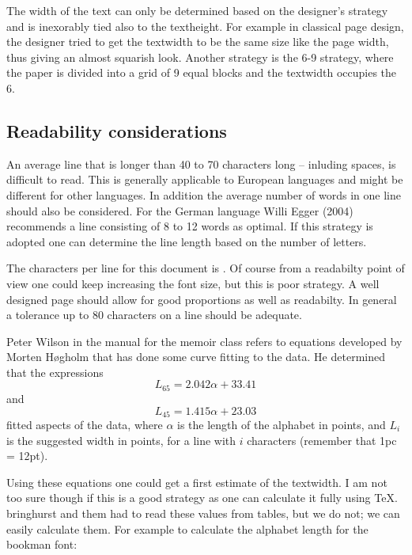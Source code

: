 The width of the text can only be determined based on the designer's strategy and is inexorably tied also to
the textheight. For example in classical page design, the designer tried to get the textwidth to be the same size like the page width, thus giving an almost squarish look. Another strategy is the 6-9 strategy, where the paper is divided into a grid of 9 equal blocks and the textwidth occupies the 6. 

\subsection{Readability considerations}

An average line that is longer than 40 to 70 characters long -- inluding spaces, is difficult to read. This is generally applicable to European languages and might be different for other languages. In addition the average number of words in one line should also be considered. For the German language Willi Egger (2004) recommends a line consisting of 8 to 12 words as optimal. If this strategy is adopted one can determine the line length based on the number of letters.

The characters per line for this document is \charactersperline. Of course from a readabilty point of view one could keep increasing the font size, but this is poor strategy. A well designed page should allow for good proportions as well as readabilty. In general a tolerance up  to 80 characters on a line should be adequate.

Peter Wilson in the manual for the memoir class refers to equations developed by Morten H{\o}gholm that has done some curve fitting
to the data. He determined that the expressions
\begin{equation}
L_{65} = 2.042\alpha + 33.41 \label{eq:L65}
\end{equation}
and
\begin{equation}
L_{45} = 1.415\alpha + 23.03 \label{eq:L45}
\end{equation}
fitted aspects of the data, where $\alpha$ is the length of the alphabet
in points, and $L_{i}$ is the suggested width in points, for a line with
$i$ characters (remember that 1pc = 12pt).

Using these equations one could get a first estimate of the textwidth. I am not too sure though if this is a good strategy as one can calculate it fully using TeX. bringhurst and them had to read these values from tables, but we do not; we can easily calculate them. For example to calculate the alphabet length for the bookman font:

